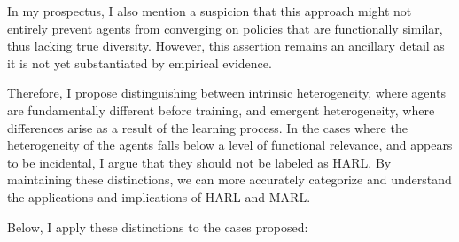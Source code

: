 \documentclass[12pt,letterpaper]{exam}
\begin{document}
In my prospectus, I also mention a suspicion that this approach might not 
entirely prevent agents from converging on policies that are functionally 
similar, thus lacking true diversity. However, this assertion remains an 
ancillary detail as it is not yet substantiated by empirical evidence.

Therefore, I propose distinguishing between intrinsic heterogeneity, where 
agents are fundamentally different before training, and emergent heterogeneity, 
where differences arise as a result of the learning process. 
In the cases where the heterogeneity of the agents falls below a level of 
functional relevance, and appears to be incidental, I argue that they
should not be labeled as HARL. By maintaining these distinctions, 
we can more accurately categorize and understand the applications and 
implications of HARL and MARL.

Below, I apply these distinctions to the cases proposed:
\end{document}
